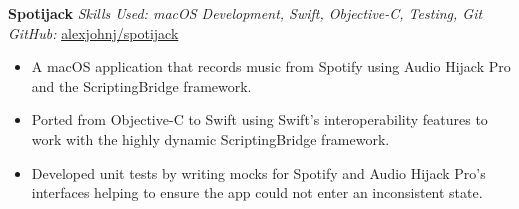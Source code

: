 \textbf{Spotijack}  \newline
\textit{Skills Used: macOS Development, Swift, Objective-C, Testing, Git}\\
\textit{GitHub:} \href{https://github.com/\myweb/spotijack}{alexjohnj/spotijack}
\begin{itemize}[leftmargin=0mm]
\item A macOS application that records music from Spotify using Audio Hijack Pro
  and the ScriptingBridge framework.
\item Ported from Objective-C to Swift using Swift's interoperability features
  to work with the highly dynamic ScriptingBridge framework.
\item Developed unit tests by writing mocks for Spotify and Audio Hijack Pro's
  interfaces helping to ensure the app could not enter an inconsistent state.
\end{itemize}

